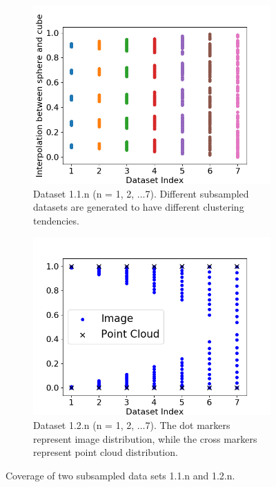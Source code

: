 \documentclass[bachelor, nocolorlinks, printoneside]{seuthesis} %
\begin{document}
\begin{Main}
\begin{figure}
	\begin{subfigure}[t]{0.45\linewidth} \centering 
     \includegraphics[width=\columnwidth]{figs/five-clusters.png}
     \caption{\small Dataset 1.1.n (n = 1, 2, $\ldots $7). Different subsampled datasets are generated to have different clustering tendencies. }\label{fig:five-clusters}
   \end{subfigure}\hspace{0.05\textwidth}
   \begin{subfigure}[t]{0.45\linewidth} \centering
     \includegraphics[width=\columnwidth]{figs/two-clusters.png}
     \caption{Dataset 1.2.n (n = 1, 2, $\ldots $7). The dot markers represent image distribution, while the cross markers represent point cloud distribution.}\label{fig:two-clusters}
   \end{subfigure}
   \caption{\small Coverage of two subsampled data sets 1.1.n and 1.2.n.}
\end{figure}


\end{Main}
\end{document}
